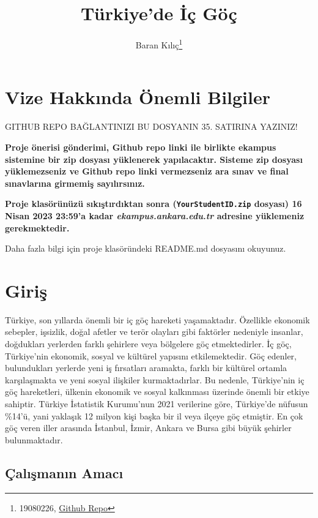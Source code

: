 \documentclass[
  12pt,
]{article}
\title{Türkiye'de İç Göç}
\author{Baran Kılıç\footnote{19080226, \href{https://github.com/Dearshen/vize3.git}{Github Repo}}}
\date{}
\begin{document}
\maketitle

\hypertarget{vize-hakkux131nda-uxf6nemli-bilgiler}{%
\section{Vize Hakkında Önemli Bilgiler}\label{vize-hakkux131nda-uxf6nemli-bilgiler}}

\colorbox{BurntOrange}{GITHUB REPO BAĞLANTINIZI BU DOSYANIN 35. SATIRINA YAZINIZ!}

\textbf{Proje önerisi gönderimi, Github repo linki ile birlikte ekampus sistemine bir zip dosyası yüklenerek yapılacaktır. Sisteme zip dosyası yüklemezseniz ve Github repo linki vermezseniz ara sınav ve final sınavlarına girmemiş sayılırsınız.}

\textbf{Proje klasörünüzü sıkıştırdıktan sonra (\texttt{YourStudentID.zip} dosyası) 16 Nisan 2023 23:59'a kadar \emph{ekampus.ankara.edu.tr} adresine yüklemeniz gerekmektedir.}

\colorbox{WildStrawberry}{Daha fazla bilgi için proje klasöründeki README.md dosyasını okuyunuz.}

\hypertarget{giriux15f}{%
\section{Giriş}\label{giriux15f}}

Türkiye, son yıllarda önemli bir iç göç hareketi yaşamaktadır. Özellikle ekonomik sebepler, işsizlik, doğal afetler ve terör olayları gibi faktörler nedeniyle insanlar, doğdukları yerlerden farklı şehirlere veya bölgelere göç etmektedirler. İç göç, Türkiye'nin ekonomik, sosyal ve kültürel yapısını etkilemektedir. Göç edenler, bulundukları yerlerde yeni iş fırsatları aramakta, farklı bir kültürel ortamla karşılaşmakta ve yeni sosyal ilişkiler kurmaktadırlar. Bu nedenle, Türkiye'nin iç göç hareketleri, ülkenin ekonomik ve sosyal kalkınması üzerinde önemli bir etkiye sahiptir. Türkiye İstatistik Kurumu'nun 2021 verilerine göre, Türkiye'de nüfusun \%14'ü, yani yaklaşık 12 milyon kişi başka bir il veya ilçeye göç etmiştir. En çok göç veren iller arasında İstanbul, İzmir, Ankara ve Bursa gibi büyük şehirler bulunmaktadır.

\hypertarget{uxe7alux131ux15fmanux131n-amacux131}{%
\subsection{Çalışmanın Amacı}\label{uxe7alux131ux15fmanux131n-amacux131}}
\end{document}
